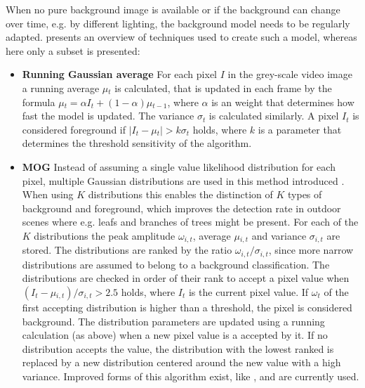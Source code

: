 When no pure background image is available 
or if the background can change over time, e.g. by different lighting,
the background model needs to be regularly adapted.
\textcite[][]{piccardi2004background} presents an overview of techniques used to create such a model, 
whereas here only a subset is presented:

\begin{itemize}
    
    \item \textbf{Running Gaussian average} For each pixel $ I $  in the grey-scale video image a running average $ \mu{}_t$ is calculated, that is updated in each frame by the formula $ \mu{}_t = \alpha{}I_t + (1 - \alpha)\mu{}_{t-1} $, where $ \alpha $ is an weight that determines how fast the model is updated. The variance $ \sigma{}_t $ is calculated similarly. A pixel $ I_t $ is considered foreground if $ |I_t - \mu{}_t| > k\sigma{}_t $ holds, where $ k $ is a parameter that determines the threshold sensitivity of the algorithm.
    \item \textbf{\acf{MOG}} Instead of assuming a single value likelihood distribution for each pixel, multiple Gaussian distributions are used in this method introduced \textcite[][]{stauffer1999background}. 
    When using $ K $ distributions this enables the distinction of $ K $ types of background and foreground, which improves the detection rate in outdoor scenes where e.g. leafs and branches of trees might be present. 
    For each of the $ K $ distributions the peak amplitude $ \omega{}_{i,t} $, average $ \mu{}_{i,t} $ and variance $ \sigma{}_{i,t} $ are stored.
    The distributions are ranked by the ratio $ \omega{}_{i,t} / \sigma{}_{i, t}$, since more narrow distributions are assumed to belong to a background classification.
    The distributions are checked in order of their rank to accept a pixel value when $ (I_t - \mu{}_{i,t})/\sigma{}_{i,t} > 2.5 $ holds, where $ I_t $ is the current pixel value.
    If $ \omega{}_{t} $ of the first accepting distribution is higher than a threshold, the pixel is considered background.
    The distribution parameters are updated using a running calculation (as above) when a new pixel value is a accepted by it.
    If no distribution accepts the value, the distribution with the lowest ranked is replaced by a new distribution centered around the new value with a high variance.
    Improved forms of this algorithm exist, like \autocite[][]{chan2011background}, and are currently used.
    
\end{itemize}

